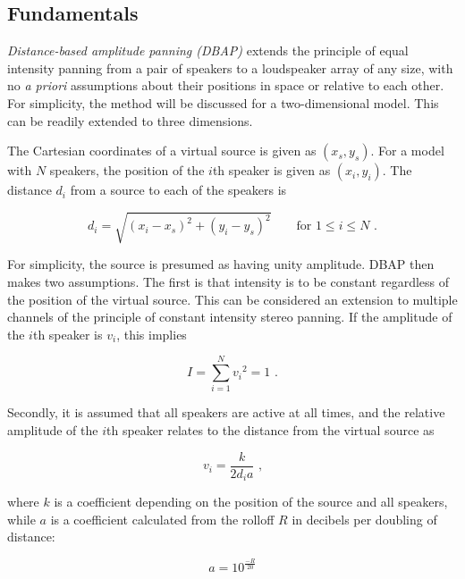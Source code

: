 \documentclass[twoside,10pt]{article}
\begin{document}
\subsection{Fundamentals}

\textit{Distance-based amplitude panning (DBAP)} extends the principle of equal intensity panning from a pair of speakers to a loudspeaker array of any size, with no \textit{a priori} assumptions about their positions in space or relative to each other.
For simplicity, the method will be discussed for a two-dimensional model. This can be readily extended to three dimensions.

The Cartesian coordinates of a virtual source is given as $(x_{s}, y_{s})$. For a model with $N$ speakers, the position of the $i$th speaker is given as $(x_{i}, y_{i})$. The distance $d_{i}$ from a source to each of the speakers is

\begin{equation} \label{eq:distance}
d_{i} = \sqrt{ {(x_{i} - x_{s})}^2 + {(y_{i} - y_{s})}^2 } \qquad \textrm{for } 1 \leq i \leq N \textrm{ .}
\end{equation}

For simplicity, the source is presumed as having unity amplitude. DBAP then makes two assumptions. The first is that intensity is to be constant regardless of the position of the virtual source. This can be considered an extension to multiple channels of the principle of constant intensity stereo panning. If the amplitude of the $i$th speaker is $v_{i}$, this implies

\begin{equation} \label{eq:constant_intensity}
I = \sum_{i=1}^{N} {v_{i}}^2 = 1 \textrm{ .}
\end{equation}

Secondly, it is assumed that all speakers are active at all times, and the relative amplitude of the $i$th speaker relates to the distance from the virtual source as 

\begin{equation} \label{eq:inverse_distance}
v_{i} = \frac{k}{2 d_{i} a} \textrm{ ,}
\end{equation}

where $k$ is a coefficient depending on the position of the source and all speakers, while $a$ is a coefficient calculated from the rolloff $R$ in decibels per doubling of distance:

\begin{equation} \label{eq:rolloff}
	a = 10^{\frac{-R}{20}}
\end{equation}
\end{document}
